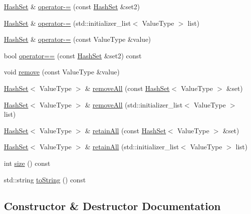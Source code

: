\begin{DoxyCompactItemize}
\item 
\mbox{\hyperlink{classHashSet}{Hash\+Set}} \& \mbox{\hyperlink{classHashSet_ad5746f40baf354cdd544686617ae0bfc}{operator-\/=}} (const \mbox{\hyperlink{classHashSet}{Hash\+Set}} \&set2)
\item 
\mbox{\hyperlink{classHashSet}{Hash\+Set}} \& \mbox{\hyperlink{classHashSet_ac3c755a24c652eb7ae7364da211d4188}{operator-\/=}} (std\+::initializer\+\_\+list$<$ Value\+Type $>$ list)
\item 
\mbox{\hyperlink{classHashSet}{Hash\+Set}} \& \mbox{\hyperlink{classHashSet_aedaa1e0349df4cde2e3e56659e78f51f}{operator-\/=}} (const Value\+Type \&value)
\item 
bool \mbox{\hyperlink{classHashSet_ad65fa98dcd20bd11d6bd466d15f20472}{operator==}} (const \mbox{\hyperlink{classHashSet}{Hash\+Set}} \&set2) const
\item 
void \mbox{\hyperlink{classHashSet_ab8213d15b557acafdd461c231e9ade3b}{remove}} (const Value\+Type \&value)
\item 
\mbox{\hyperlink{classHashSet}{Hash\+Set}}$<$ Value\+Type $>$ \& \mbox{\hyperlink{classHashSet_a43bfd4637e7359634f7b3b57ca6379a3}{remove\+All}} (const \mbox{\hyperlink{classHashSet}{Hash\+Set}}$<$ Value\+Type $>$ \&set)
\item 
\mbox{\hyperlink{classHashSet}{Hash\+Set}}$<$ Value\+Type $>$ \& \mbox{\hyperlink{classHashSet_ae4e6fba96cbdc7cc417dea499fa89e91}{remove\+All}} (std\+::initializer\+\_\+list$<$ Value\+Type $>$ list)
\item 
\mbox{\hyperlink{classHashSet}{Hash\+Set}}$<$ Value\+Type $>$ \& \mbox{\hyperlink{classHashSet_a316099cf6e8079e4c1d41c60d89a48b4}{retain\+All}} (const \mbox{\hyperlink{classHashSet}{Hash\+Set}}$<$ Value\+Type $>$ \&set)
\item 
\mbox{\hyperlink{classHashSet}{Hash\+Set}}$<$ Value\+Type $>$ \& \mbox{\hyperlink{classHashSet_a0aefd5a11e45f8ddcec51d83a92fd5d8}{retain\+All}} (std\+::initializer\+\_\+list$<$ Value\+Type $>$ list)
\item 
int \mbox{\hyperlink{classHashSet_af9593d4a5ff4274efaf429cb4f9e57cc}{size}} () const
\item 
std\+::string \mbox{\hyperlink{classHashSet_a1fe5121d6528fdea3f243321b3fa3a49}{to\+String}} () const
\end{DoxyCompactItemize}


\subsection{Constructor \& Destructor Documentation}
\mbox{\label{classHashSet_aa4f0e7330b8f252895e4efe56ff777e9}} 
